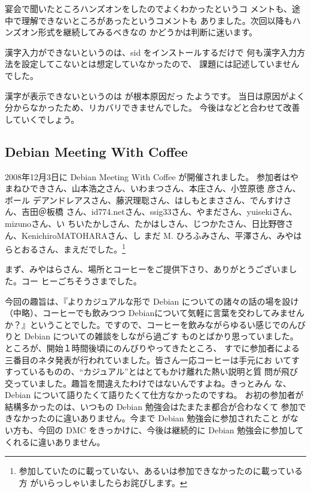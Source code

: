 \documentclass[mingoth,a4paper]{jsarticle}
\begin{document}
宴会で聞いたところハンズオンをしたのでよくわかったというコ
メントも、途中で理解できないところがあったというコメントも
ありました。次回以降もハンズオン形式を継続してみるべきなの
かどうかは判断に迷います。


漢字入力ができないというのは、sid をインストールするだけで
何も漢字入力方法を設定してこないとは想定していなかったので、
課題には記述していませんでした。

漢字が表示できないというのは
が根本原因だっ
たようです。
当日は原因がよく分からなかったため、リカバリできませんでした。
今後はなどと合わせて改善していくでしょう。


\subsection{Debian Meeting With Coffee}

2008年12月3日に Debian Meeting With Coffee が開催されました。
参加者はやまねひできさん、山本浩之さん、いわまつさん、本庄さん、小笠原徳
彦さん、ボール
デアンドレアスさん、藤沢理聡さん、はしもとまささん、でんすけさん、吉田＠板橋
さん、id774.netさん、ssig33さん、やまださん、yuisekiさん、mizunoさん、い
ちいたかしさん、たかはしさん、じつかたさん、日比野啓さん、KenichiroMATOHARAさん、し
まだ M. ひろふみさん、平澤さん、みやはらとおるさん、まえだでした。\footnote{参加していたのに載っていない、あるいは参加できなかったのに載っている方
がいらっしゃいましたらお詫びします。}

まず、みやはらさん、場所とコーヒーをご提供下さり、ありがとうございました。コー
ヒーごちそうさまでした。


今回の趣旨は、『よりカジュアルな形で Debian についての諸々の話の場を設け
（中略）、コーヒーでも飲みつつ Debianについて気軽に言葉を交わしてみません
か？』ということでした。ですので、コーヒーを飲みながらゆるい感じでのんび
りと Debian についての雑談をしながら過ごす
ものとばかり思っていました。
ところが、開始１時間後頃にのんびりやってきたところ、
すでに参加者による三番目のネタ発表が行われていました。皆さん一応コーヒーは手元にお
いてすすっているものの、``カジュアル''とはとてもかけ離れた熱い説明と質
問が飛び交っていました。趣旨を間違えたわけではないんですよね。きっとみん
な、Debian について語りたくて語りたくて仕方なかったのですね。
お初の参加者が結構多かったのは、いつもの Debian 勉強会はたまたま都合が合わなくて
参加できなかったのに違いありません。今まで Debian 勉強会に参加されたこと
がない方も、今回の DMC をきっかけに、今後は継続的に Debian 勉強会に参加して
くれるに違いありません。
\end{document}
